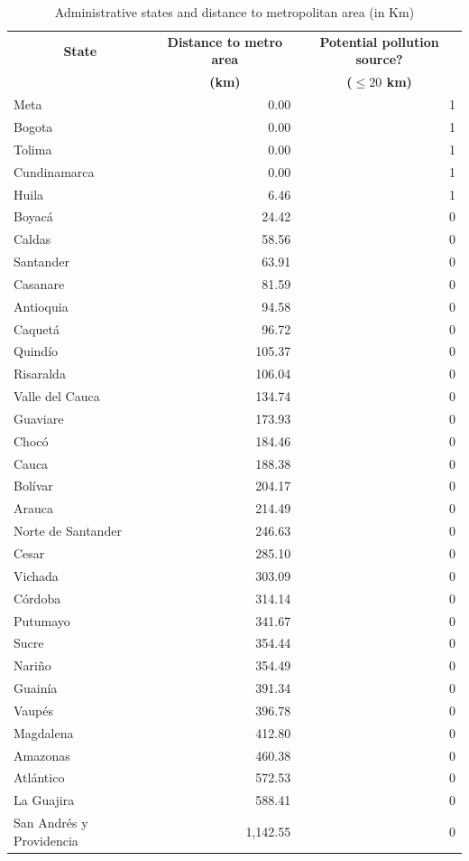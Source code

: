 \begin{table}[htbp]
  \centering
  \caption{Administrative states and distance to metropolitan area (in Km)}
  \begin{tabular}{lrr}
    \midrule
    \midrule
    \multicolumn{1}{c}{\textbf{State}} &
    \multicolumn{1}{c}{\textbf{Distance to metro area}} &
    \multicolumn{1}{c}{\textbf{Potential pollution source?}} \\
    \multicolumn{1}{c}{} &
    \multicolumn{1}{c}{\textbf{(km)}} &
    \multicolumn{1}{c}{\textbf{($\leq 20$ km)}} \\
    \midrule
    Meta & 0.00 & 1 \\
    Bogota & 0.00 & 1 \\
    Tolima & 0.00 & 1 \\
    Cundinamarca & 0.00 & 1 \\
    Huila & 6.46 & 1 \\
    Boyacá & 24.42 & 0 \\
    Caldas & 58.56 & 0 \\
    Santander & 63.91 & 0 \\
    Casanare & 81.59 & 0 \\
    Antioquia & 94.58 & 0 \\
    Caquetá & 96.72 & 0 \\
    Quindío & 105.37 & 0 \\
    Risaralda & 106.04 & 0 \\
    Valle del Cauca & 134.74 & 0 \\
    Guaviare & 173.93 & 0 \\
    Chocó & 184.46 & 0 \\
    Cauca & 188.38 & 0 \\
    Bolívar & 204.17 & 0 \\
    Arauca & 214.49 & 0 \\
    Norte de Santander & 246.63 & 0 \\
    Cesar & 285.10 & 0 \\
    Vichada & 303.09 & 0 \\
    Córdoba & 314.14 & 0 \\
    Putumayo & 341.67 & 0 \\
    Sucre & 354.44 & 0 \\
    Nariño & 354.49 & 0 \\
    Guainía & 391.34 & 0 \\
    Vaupés & 396.78 & 0 \\
    Magdalena & 412.80 & 0 \\
    Amazonas & 460.38 & 0 \\
    Atlántico & 572.53 & 0 \\
    La Guajira & 588.41 & 0 \\
    San Andrés y Providencia & 1,142.55 & 0 \\
    \bottomrule
    \bottomrule
  \end{tabular}
  \label{table_state_metro_distances}
\end{table}
